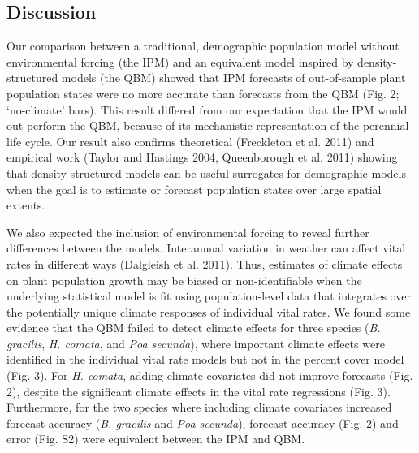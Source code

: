 \documentclass[12pt,]{article}
\begin{document}
\subsection{Discussion}\label{discussion}

Our comparison between a traditional, demographic population model
without environmental forcing (the IPM) and an equivalent model inspired
by density-structured models (the QBM) showed that IPM forecasts of
out-of-sample plant population states were no more accurate than
forecasts from the QBM (Fig. 2; `no-climate' bars). This result differed
from our expectation that the IPM would out-perform the QBM, because of
its mechanistic representation of the perennial life cycle. Our result
also confirms theoretical (Freckleton et al. 2011) and empirical work
(Taylor and Hastings 2004, Queenborough et al. 2011) showing that
density-structured models can be useful surrogates for demographic
models when the goal is to estimate or forecast population states over
large spatial extents.

We also expected the inclusion of environmental forcing to reveal
further differences between the models. Interannual variation in weather
can affect vital rates in different ways (Dalgleish et al. 2011). Thus,
estimates of climate effects on plant population growth may be biased or
non-identifiable when the underlying statistical model is fit using
population-level data that integrates over the potentially unique
climate responses of individual vital rates. We found some evidence that
the QBM failed to detect climate effects for three species (\emph{B.
gracilis}, \emph{H. comata}, and \emph{Poa secunda}), where important
climate effects were identified in the individual vital rate models but
not in the percent cover model (Fig. 3). For \emph{H. comata}, adding
climate covariates did not improve forecasts (Fig. 2), despite the
significant climate effects in the vital rate regressions (Fig. 3).
Furthermore, for the two species where including climate covariates
increased forecast accuracy (\emph{B. gracilis} and \emph{Poa secunda}),
forecast accuracy (Fig. 2) and error (Fig. S2) were equivalent between
the IPM and QBM.
\end{document}
